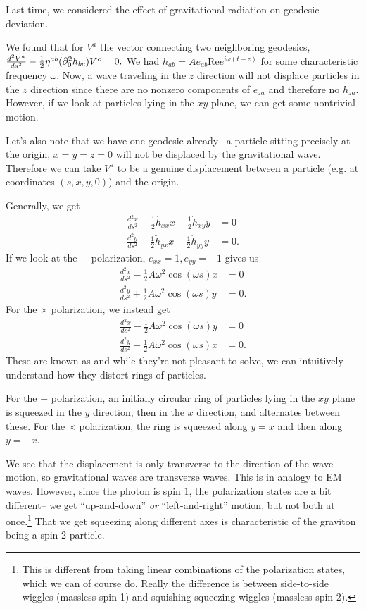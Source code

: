 Last time, we considered the effect of gravitational radiation on geodesic deviation.

We found that for $V^a$ the vector connecting two neighboring geodesics,
$\frac{d^2V^a}{ds^2}-\frac{1}{2}\eta^{ab}(\partial_0^2 h_{bc}) V^c=0.$
We had $h_{ab}=Ae_{ab}\text{Re}e^{i\omega(t-z)}$
for some characteristic frequency $\omega$. Now, a wave traveling in the $z$ direction will not displace particles in the $z$ direction since there are no nonzero components of $e_{za}$ and therefore no $h_{za}$. However, if we look at particles lying in the $xy$ plane, we can get some nontrivial motion.

Let's also note that we have one geodesic already--  a particle sitting precisely at the origin, $x=y=z=0$ will not be displaced by the gravitational wave. Therefore we can take $V^a$ to be a genuine displacement between a particle (e.g. at coordinates $(s,x,y,0)$) and the origin.

Generally, we get
\begin{align*}
    \frac{d^2x}{ds^2}-\frac{1}{2}\ddot h_{xx}x -\frac{1}{2}\ddot h_{xy}y &=0\\
    \frac{d^2y}{ds^2}-\frac{1}{2}\ddot h_{yx}x-\frac{1}{2} \ddot h_{yy}y&=0.
\end{align*}
If we look at the $+$ polarization, $e_{xx}=1,e_{yy}=-1$ gives us
\begin{align*}
    \frac{d^2x}{ds^2}-\frac{1}{2}A\omega^2 \cos(\omega s) x &=0\\
    \frac{d^2y}{ds^2}+\frac{1}{2} A\omega^2 \cos(\omega s) y&=0.
\end{align*}
For the $\times$ polarization, we instead get
\begin{align*}
    \frac{d^2x}{ds^2}-\frac{1}{2}A\omega^2 \cos(\omega s) y &=0\\
    \frac{d^2y}{ds^2}+\frac{1}{2} A\omega^2 \cos(\omega s) x&=0.
\end{align*}
These are known as  and while they're not pleasant to solve, we can intuitively understand how they distort rings of particles.

For the $+$ polarization, an initially circular ring of particles lying in the $xy$ plane is squeezed in the $y$ direction, then in the $x$ direction, and alternates between these. For the $\times$ polarization, the ring is squeezed along $y=x$ and then along $y=-x$.

We see that the displacement is only transverse to the direction of the wave motion, so gravitational waves are transverse waves. This is in analogy to EM waves. However, since the photon is spin $1$, the polarization states are a bit different-- we get ``up-and-down'' \emph{or} ``left-and-right'' motion, but not both at once.\footnote{This is different from taking linear combinations of the polarization states, which we can of course do. Really the difference is between side-to-side wiggles (massless spin 1) and squishing-squeezing wiggles (massless spin 2).} That we get squeezing along different axes is characteristic of the graviton being a spin 2 particle.

